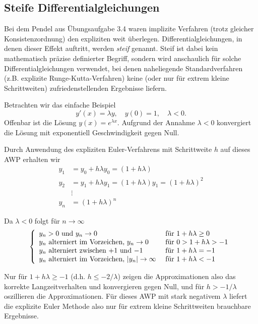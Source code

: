 \documentclass[12pt,a4paper]{book}
\theoremstyle{break}
\theoremstyle{nonumberplain}
\newcommand{\1}{\mathbbm{1}} 			      	%
\begin{document}
\subsection{Steife Differentialgleichungen}\label{subsect:stiffness}

Bei dem Pendel aus Übungsaufgabe 3.4 waren implizite Verfahren (trotz gleicher Konsistenzordnung) den expliziten weit überlegen. 
Differentialgleichungen, in denen dieser Effekt auftritt, werden \emph{steif} genannt. Steif ist dabei kein mathematisch präzise definierter Begriff, sondern wird anschaulich für solche Differentialgleichungen verwendet, bei denen naheliegende Standardverfahren (z.B. explizite Runge-Kutta-Verfahren) keine (oder nur für extrem kleine Schrittweiten) zufriedenstellenden Ergebnisse liefern. 

Betrachten wir das einfache Beispiel 
\[
y'(x)=\lambda y,\quad y(0)=1, \quad \lambda<0.
\]
Offenbar ist die Lösung $y(x)=e^{\lambda x}$. Aufgrund der Annahme $\lambda<0$ konvergiert die
Lösung mit exponentiell Geschwindigkeit gegen Null.

Durch Anwendung des expliziten Euler-Verfahrens mit Schrittweite $h$ auf dieses AWP erhalten wir
\begin{align*}
y_1 &= y_0 + h \lambda y_0=(1+h\lambda)\\
y_2 &= y_1 + h \lambda y_1=(1+h\lambda)y_1=(1+h\lambda)^2\\
& \vdots\\
y_n&= (1+h\lambda)^n 
\end{align*}

Da $\lambda<0$ folgt für $n\to \infty$ 
\[
\left\{ \begin{array}{l l} \mbox{$y_n>0$ und $y_n\to 0$} & \mbox{ für $1+h\lambda \geq 0$}\\
\mbox{$y_n$ alterniert im Vorzeichen, $y_n\to 0$} & \mbox{ für $0>1+h\lambda>-1$}\\
\mbox{$y_n$ alterniert zwischen $+1$ und $-1$} & \mbox{ für $1+h\lambda=-1$}\\
\mbox{$y_n$ alterniert im Vorzeichen, $|y_n|\to \infty$} & \mbox{ für $1+h\lambda<-1$}
\end{array}\right.
\] 

Nur für $1+h\lambda \geq -1$ (d.h. $h\leq -2/\lambda$) zeigen die Approximationen also das korrekte Langzeitverhalten und 
konvergieren gegen Null, und für $h> -1/\lambda$ oszillieren die Approximationen.
Für dieses AWP mit stark negativem $\lambda$ liefert die explizite Euler Methode also nur
für extrem kleine Schrittweiten brauchbare Ergebnisse.
\end{document}
